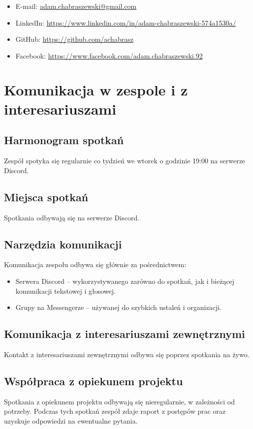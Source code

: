\documentclass[12pt,a4paper,colorlinks=true,linkcolor=NavyBlue,citecolor=red,urlcolor=NavyBlue]{book}
\begin{document}
\begin{itemize}
\begin{itemize}
        \begin{itemize}
            \item E-mail: \href{mailto:adam.chabraszewski@gmail.com}{adam.chabraszewski@gmail.com}   
            \item LinkedIn: \url{https://www.linkedin.com/in/adam-chabraszewski-574a1530a/}
            \item GitHub: \url{https://github.com/achabrasz}
            \item Facebook: \url{https://www.facebook.com/adam.chabraszewski.92}
        \end{itemize}
    \end{itemize}
\end{itemize}

\chapter{Komunikacja w zespole i z interesariuszami}
\section{Harmonogram spotkań}
Zespół spotyka się regularnie co tydzień we wtorek o godzinie 19:00 na serwerze Discord.  

\section{Miejsca spotkań}
Spotkania odbywają się na serwerze Discord.

\section{Narzędzia komunikacji}
Komunikacja zespołu odbywa się głównie za pośrednictwem:  
\begin{itemize}
    \item Serwera Discord – wykorzystywanego zarówno do spotkań, jak i bieżącej komunikacji tekstowej i głosowej.  
    \item Grupy na Messengerze – używanej do szybkich ustaleń i organizacji.  
\end{itemize}  

\section{Komunikacja z interesariuszami zewnętrznymi}
Kontakt z interesariuszami zewnętrznymi odbywa się poprzez spotkania na żywo.

\section{Współpraca z opiekunem projektu}
Spotkania z opiekunem projektu odbywają się nieregularnie, w zależności od potrzeby. Podczas tych spotkań zespół zdaje raport z postępów prac oraz uzyskuje odpowiedzi na ewentualne pytania.  
\end{document}
